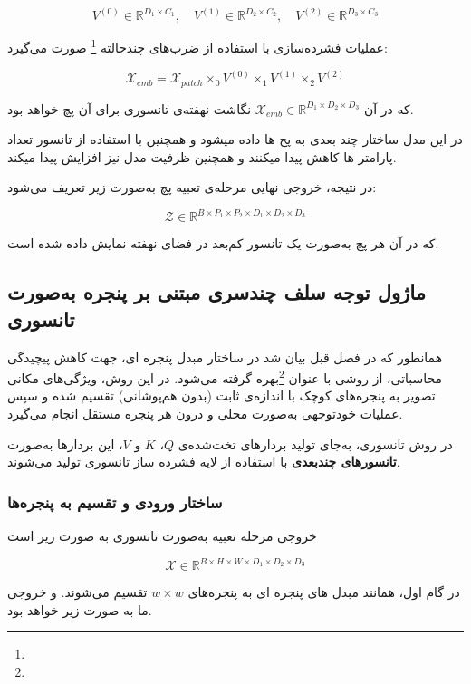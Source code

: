\[
V^{(0)} \in \mathbb{R}^{D_1 \times C_1}, \quad
V^{(1)} \in \mathbb{R}^{D_2 \times C_2}, \quad
V^{(2)} \in \mathbb{R}^{D_3 \times C_3}
\]

عملیات فشرده‌سازی با استفاده از ضرب‌های چندحالته \footnote{} صورت می‌گیرد:

\[
\mathcal{X}_{emb} = \mathcal{X}_{patch} \times_0 V^{(0)} \times_1 V^{(1)} \times_2 V^{(2)}
\]

که در آن $\mathcal{X}_{emb} \in \mathbb{R}^{D_1 \times D_2 \times D_3}$ نگاشت نهفته‌ی تانسوری برای آن پچ خواهد بود.

در این مدل ساختار چند بعدی به پج ها داده میشود و همچنین با استفاده از تانسور تعداد پارامتر ها کاهش پیدا میکنند و همچنین ظرفیت مدل نیز افزایش پیدا میکند.




در نتیجه، خروجی نهایی مرحله‌ی تعبیه پچ به‌صورت زیر تعریف می‌شود:

\[
\mathcal{Z} \in \mathbb{R}^{B \times P_1 \times P_2 \times D_1 \times D_2 \times D_3}
\]

که در آن هر پچ به‌صورت یک تانسور کم‌بعد در فضای نهفته نمایش داده شده است.


\subsection{ماژول توجه سلف چندسری مبتنی بر پنجره به‌صورت تانسوری}

 همانطور که در فصل قبل بیان شد در ساختار مبدل پنجره ای، جهت کاهش پیچیدگی محاسباتی، از روشی با عنوان  \footnote{}بهره گرفته می‌شود. در این روش، ویژگی‌های مکانی تصویر به پنجره‌های کوچک با اندازه‌ی ثابت (بدون هم‌پوشانی) تقسیم شده و سپس عملیات  خود‌توجهی به‌صورت محلی و درون هر پنجره مستقل انجام می‌گیرد.

در روش تانسوری، به‌جای تولید بردارهای تخت‌شده‌ی $Q$، $K$ و $V$، این بردارها به‌صورت \textbf{تانسورهای چندبعدی} با استفاده از لایه فشرده ساز تانسوری تولید می‌شوند.

\subsubsection*{ ساختار ورودی و تقسیم به پنجره‌ها}

خروجی مرحله تعبیه  به‌صورت تانسوری به صورت زیر است 

\[
\mathcal{X} \in \mathbb{R}^{B \times H \times W \times D_1 \times D_2 \times D_3}
\]



در گام اول، همانند مبدل های پنجره ای به پنجره‌های $w \times w$ تقسیم می‌شوند. و خروجی ما به صورت  زیر خواهد بود.

